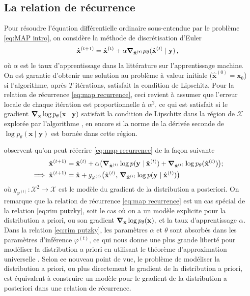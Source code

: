 \subsection{La relation de récurrence}
Pour résoudre l'équation différentielle ordinaire sous-entendue par le problème \eqref{eq:MAP intro}, 
on considère la méthode de discrétisation d'Euler 
\begin{equation}\label{eq:map recurrence}
        \hat{\mathbf{x}}^{(t+1)} = \hat{\mathbf{x}}^{(t)} + \alpha \grad_{\hat{\mathbf{x}}^{(t)}} p_\theta(\hat{\mathbf{x}}^{(t)} \mid \mathbf{y})\, ,
\end{equation} 
où $\alpha$ est le taux d'apprentissage dans la littérature sur 
l'apprentissage machine.
On est garantie d'obtenir une solution 
au problème à valeur initiale ($\hat{\mathbf{x}}^{(0)} = \mathbf{x}_0$) si l'algorithme, après $T$ itérations, 
satisfait la condition de Lipschitz. Pour la relation de récurrence \eqref{eq:map recurrence}, ceci revient 
à assumer que l'erreur locale de chaque itération est proportionnelle à $\alpha^{2}$, ce qui est 
satisfait si le gradient $\grad_{\mathbf{x}}\log p_\theta(\mathbf{x} \mid \mathbf{y})$ 
satisfait la condition de Lipschitz dans la région de $\mathcal{X}$ explorée par l'algorithme \citep{Atkinson1989,Butcher2016}, 
en encore si la norme de la dérivée seconde de $\log p_\theta(\mathbf{x} \mid \mathbf{y})$ est bornée dans cette région.

\citet{Putzky2017} observent qu'on peut réécrire \eqref{eq:map recurrence} de la façon suivante
\begin{align}
        \hat{\mathbf{x}}^{(t+1)} &= 
        \hat{\mathbf{x}}^{(t)} + \alpha \big( \grad_{\hat{\mathbf{x}}^{(t)}}\log p(\mathbf{y} \mid \hat{\mathbf{x}}^{(t)}) 
        +  \grad_{\hat{\mathbf{x}}^{(t)}}\log p_\theta(\hat{\mathbf{x}}^{(t)})\big);\\
        \label{eq:rim putzky}
        \implies \hat{\mathbf{x}}^{(t+1)} &= \hat{\mathbf{x}} + g_{\varphi^{(t)}}\big(\hat{\mathbf{x}}^{(t)},\, \grad_{\hat{\mathbf{x}}^{(t)}} \log p(\mathbf{y} \mid \hat{\mathbf{x}}^{(t)})\big)
\end{align}
où $g_{\varphi^{(t)}}: \mathcal{X}^{2} \rightarrow \mathcal{X}$ est le modèle du gradient de la distribution 
a posteriori. 
On remarque que la relation de récurrence \eqref{eq:map recurrence} est un cas spécial de la relation \eqref{eq:rim putzky}, 
soit le cas où on a un modèle explicite pour la distribution a priori, ou son gradient $\grad_{\mathbf{x}} \log p_\theta(\mathbf{x})$,
et la taux d'apprentissage $\alpha$. 
Dans la relation \eqref{eq:rim putzky}, les paramètres $\alpha$ et $\theta$ sont absorbés dans les paramètres d'inférence $\varphi^{(t)}$, ce qui nous donne 
une plus grande liberté pour modéliser la distribution a priori en utilisant le théorème d'approximation universelle \citep{Cybenko1989,Hornik1991}. 
Selon ce nouveau point de vue, 
le problème de modéliser la distribution a priori, ou plus directement le gradient de la distribution a priori, 
est équivalent à construire un modèle pour le gradient de la distribution a posteriori dans une relation 
de récurrence.

